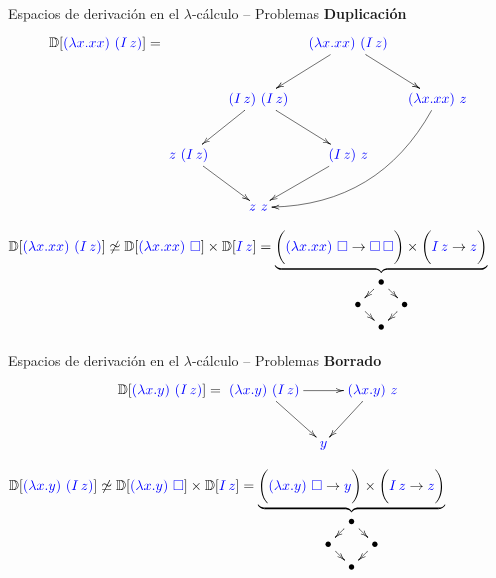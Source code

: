 \documentclass{beamer}
\newcommand{\cLam}[1]{{\color{darkBlue} #1}}
\begin{document}
\begin{frame}{Espacios de derivación en el $\lambda$-cálculo -- Problemas}
\textbf{Duplicación}
\[\ulbDeriv{\cLam{(\lam{x}{x x})\ (I\, z)}} =
\xymatrix@C=0.3cm{
& & \cLam{(\lam{x}{x x})\ (I\, z)} \ar[dr] \ar[dl] & \\
& \cLam{(I\, z)\ (I\, z)} \ar[dr] \ar[dl] & & \cLam{(\lam{x}{x x})\ z} \ar@/^2.0pc/[ddll]\\
\cLam{z\ (I\, z)} \ar[dr] & & \cLam{(I\, z)\ z} \ar[dl] & \\
 & \cLam{z\ z} & & \\
}
\]

{\footnotesize
$\ulbDeriv{\cLam{(\lam{x}{x x})\ (I\, z)}}
\not\simeq
\ulbDeriv{\cLam{(\lam{x}{x x})\ \conbase}} \times \ulbDeriv{\cLam{I\, z}}
=
\underbrace{\bigg(\cLam{(\lam{x}{x x})\ \conbase} \to \cLam{\conbase \, \conbase}\bigg) \times \bigg(\cLam{I\, z} \to \cLam{z}\bigg)}_{\xymatrix@=0.2cm{
& \bullet \ar[dr] \ar[dl] & \\
\bullet \ar[dr] & & \bullet \ar[dl] \\
& \bullet &}}$
}
\end{frame}

\begin{frame}{Espacios de derivación en el $\lambda$-cálculo -- Problemas}
\textbf{Borrado}
\[\ulbDeriv{\cLam{(\lam{x}{y})\ (I\, z)}} =
\xymatrix@C=0.3cm{
\cLam{(\lam{x}{y})\ (I\, z)} \ar[rr] \ar[dr] & & \cLam{(\lam{x}{y})\ z} \ar[dl]\\
& \cLam{y} & \\
}
\]

{\footnotesize
$\ulbDeriv{\cLam{(\lam{x}{y})\ (I\, z)}}
\not\simeq
\ulbDeriv{\cLam{(\lam{x}{y})\ \conbase}} \times \ulbDeriv{\cLam{I\, z}}
=
\underbrace{\bigg(\cLam{(\lam{x}{y})\ \conbase} \to \cLam{y}\bigg) \times \bigg(\cLam{I\, z} \to \cLam{z}\bigg)}_{\xymatrix@=0.2cm{
& \bullet \ar[dr] \ar[dl] & \\
\bullet \ar[dr] & & \bullet \ar[dl] \\
& \bullet &}}$
}
\end{frame}
\end{document}
